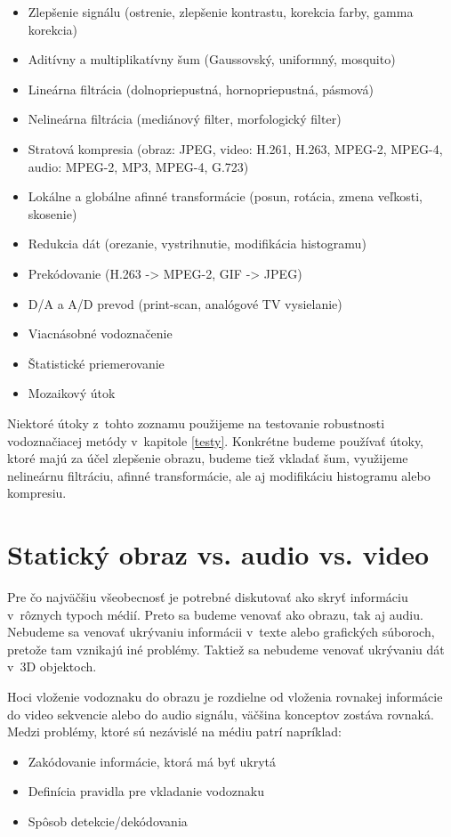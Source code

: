 \begin{itemize}
\item	Zlepšenie signálu (ostrenie, zlepšenie kontrastu, korekcia farby, gamma korekcia)
\item	Aditívny a multiplikatívny šum (Gaussovský, uniformný, mosquito)
\item	Lineárna filtrácia (dolnopriepustná, hornopriepustná, pásmová)
\item	Nelineárna filtrácia (mediánový filter, morfologický filter)
\item	Stratová kompresia (obraz: JPEG, video: H.261, H.263, MPEG-2, MPEG-4, audio: MPEG-2, MP3, MPEG-4, G.723)
\item	Lokálne a globálne afinné transformácie (posun, rotácia, zmena veľkosti, skosenie)
\item	Redukcia dát (orezanie, vystrihnutie, modifikácia histogramu)
\item	Prekódovanie (H.263 -> MPEG-2, GIF -> JPEG)
\item	D/A a A/D prevod (print-scan, analógové TV vysielanie)
\item	Viacnásobné vodoznačenie
\item	Štatistické priemerovanie
\item	Mozaikový útok
\end{itemize}

Niektoré útoky z~tohto zoznamu použijeme na testovanie robustnosti vodoznačiacej metódy v~kapitole \ref{testy}. Konkrétne budeme používať útoky, ktoré majú za účel zlepšenie obrazu, budeme tiež vkladať šum, využijeme nelineárnu filtráciu, afinné transformácie, ale aj modifikáciu histogramu alebo kompresiu.

\section{Statický obraz vs. audio vs. video}
Pre čo najväčšiu všeobecnosť je potrebné diskutovať ako skryť informáciu v~rôznych typoch médií. Preto sa budeme venovať ako obrazu, tak aj audiu. Nebudeme sa venovať ukrývaniu informácii v~texte alebo grafických súboroch, pretože tam vznikajú iné problémy. Taktiež sa nebudeme venovať ukrývaniu dát v~3D objektoch.

Hoci vloženie vodoznaku do obrazu je rozdielne od vloženia rovnakej informácie do video sekvencie alebo do audio signálu, väčšina konceptov zostáva rovnaká. Medzi problémy, ktoré sú nezávislé na médiu patrí napríklad:

\begin{itemize}
\item Zakódovanie informácie, ktorá má byť ukrytá
\item Definícia pravidla pre vkladanie vodoznaku
\item Spôsob detekcie/dekódovania
\end{itemize}


